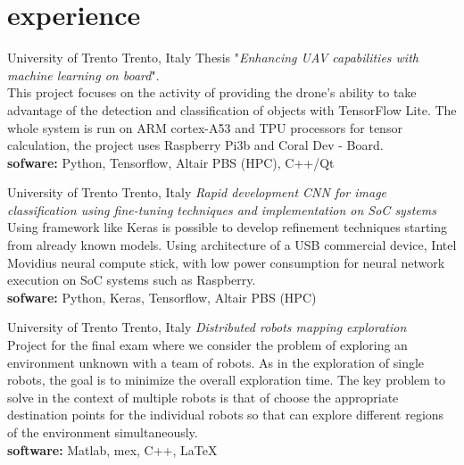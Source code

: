\documentclass[]{friggeri-cv} %
\begin{document}
\section{experience}
  \begin{entrylist}
    {University of Trento}
    {Trento, Italy}
    {Thesis "\emph{Enhancing UAV capabilities with machine learning on board}".\\
    This project focuses on the activity of providing the drone's ability to take advantage of the detection and classification of objects with TensorFlow Lite.
The whole system is run on ARM cortex-A53 and TPU processors for
tensor calculation, the project uses Raspberry Pi3b and Coral Dev - Board. \\
    \textbf{sofware:} Python, Tensorflow, Altair PBS (HPC), C++/Qt \quad
    \href{https://github.com/frank1789/MasterThesis}{\faGithub}
    }
    

    { University of Trento}
    {Trento, Italy}
    {\emph{Rapid development CNN for image classification using fine-tuning techniques and
     implementation on SoC systems}\\
    Using framework like Keras is possible to develop refinement techniques starting
    from already known models. Using architecture of a USB commercial device,
    Intel Movidius neural compute stick, with low power consumption for neural network execution
    on SoC systems such as Raspberry.\\
    \textbf{sofware:} Python, Keras, Tensorflow, Altair PBS (HPC)\quad
    \href{https://github.com/frank1789/NeuralNetworks}{\faGithub}}
      

    {University of Trento}
    {Trento, Italy}
    {\emph{Distributed robots mapping exploration}\\
    Project for the final exam where we consider the problem of exploring
    an environment unknown with a team of robots. As in the exploration of
    single robots, the goal is to minimize the overall exploration time.
    The key problem to solve in the context of multiple robots is that of choose
    the appropriate destination points for the individual robots so that can explore
    different regions of the environment simultaneously.\\
    \textbf{software: } Matlab, mex, C++, \LaTeX \quad
    \href{https://github.com/frank1789/DistributedSystemProject}{\faGithub}}
      
  \end{entrylist}
\end{document}
